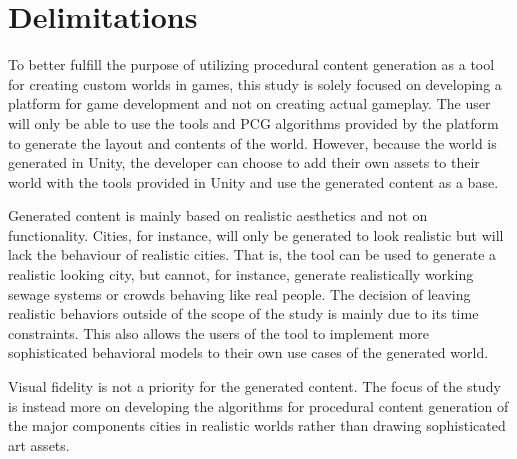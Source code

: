 \section{Delimitations}
\begin{comment}
\textcolor{red}{
Avgränsningarna ska ta upp vilka delar av problemet som inte tas upp i uppsatsen/rapporten, och anledningen till detta. Motivering av avgränsningarna är viktigt.
}
\textcolor{blue}{
\textbf{Vad ska vi inte inkludera?}
\begin{itemize}
    \item Vi gör inget spel, utan ett verktyg för spel. Eftersom vi planerar att utveckla ett verktyg är inte gameplay del av vårt scope.
    
    \item Staden ska inte vara funktionell, utan helt estetisk. Anledningen till detta är tidsbegränsningar och att spelutvecklare ska kunna lägga till sina egna funktioner till det spel de utvecklar med hjälp av vårt verktyg för stadsgenerering.
    
    \item Visual fidelity is not a priority; focus will be on developing the algorithm rather than drawing art assets. 
\end{itemize}
}
\end{comment}

To better fulfill the purpose of utilizing procedural content generation as a tool for creating custom worlds in games, this study is solely focused on developing a platform for game development and not on creating actual gameplay. The user will only be able to use the tools and PCG algorithms provided by the platform to generate the layout and contents of the world. However, because the world is generated in Unity, the developer can choose to add their own assets to their world with the tools provided in Unity and use the generated content as a base.

Generated content is mainly based on realistic aesthetics and not on functionality. Cities, for instance, will only be generated to look realistic but will lack the behaviour of realistic cities. That is, the tool can be used to generate a realistic looking city, but cannot, for instance, generate realistically working sewage systems or crowds behaving like real people. The decision of leaving realistic behaviors outside of the scope of the study is mainly due to its time constraints. This also allows the users of the tool to implement more sophisticated behavioral models to their own use cases of the generated world.

Visual fidelity is not a priority for the generated content. The focus of the study is instead more on developing the algorithms for procedural content generation of the major components cities in realistic worlds rather than drawing sophisticated art assets.